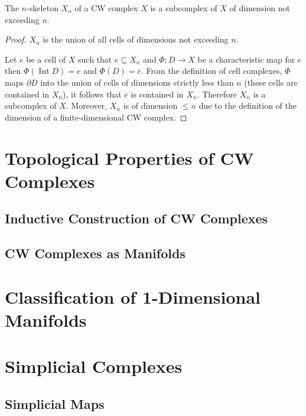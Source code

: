 \begin{note}\label{note:n-skeleton}
	The \( n \)-skeleton \( X_{n} \) of a CW complex \( X \) is a subcomplex of \( X \) of dimension not exceeding \( n \).
\end{note}

\begin{proof}
	\( X_{n} \) is the union of all cells of dimensions not exceeding \( n \).

	Let \( e \) be a cell of \( X \) such that \( e\subseteq X_{n} \) and \( \Phi: D \to X \) be a characteristic map for \( e \) then \( \Phi(\operatorname{Int} D) = e \) and \( \Phi(D) = \overline{e} \). From the definition of cell complexes, \( \Phi \) maps \( \partial D \) into the union of cells of dimensions strictly less than \( n \) (these cells are contained in \( X_{n} \)), it follows that \( \overline{e} \) is contained in \( X_{n} \). Therefore \( X_{n} \) is a subcomplex of \( X \). Moreover, \( X_{n} \) is of dimension \( \leq n \) due to the definition of the dimension of a finite-dimensional CW complex.
\end{proof}

\section{Topological Properties of CW Complexes}

\subsection{Inductive Construction of CW Complexes}

\subsection{CW Complexes as Manifolds}

\section{Classification of 1-Dimensional Manifolds}

\section{Simplicial Complexes}

\subsection{Simplicial Maps}

